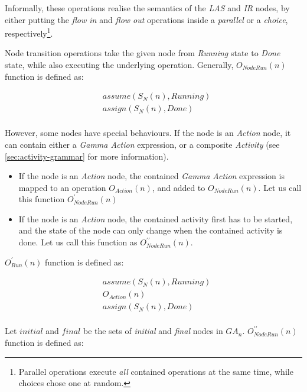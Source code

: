 Informally, these operations realise the semantics of the \emph{LAS} and \emph{IR} nodes, by either putting the \emph{flow in} and \emph{flow out} operations inside a \emph{parallel} or a \emph{choice}, respectively\footnote{Parallel operations execute \emph{all} contained operations at the same time, while choices chose one at random.}.

\begin{definition}
	Node transition operations take the given node from \emph{Running} state to \emph{Done} state, while also executing the underlying operation. Generally, \(O_\mathit{NodeRun}(n)\) function is defined as:
	
	\begin{align*}
		&\mathit{assume}(S_N(n), \mathit{Running}) \\
		&\mathit{assign}(S_N(n), \mathit{Done}) \\
	\end{align*}

	However, some nodes have special behaviours. If the node is an \emph{Action} node, it can contain either a \emph{Gamma Action} expression, or a composite \emph{Activity} (see \autoref{sec:activity-grammar} for more information).

	\begin{itemize}
		\item If the node is an \emph{Action} node, the contained \emph{Gamma Action} expression is mapped to an operation \(O_\mathit{Action}(n)\), and added to \( O_\mathit{NodeRun}(n) \). Let us call this function \(O_\mathit{NodeRun}^\prime(n)\)
		\item If the node is an \emph{Action} node, the contained activity first has to be started, and the state of the node can only change when the contained activity is done. Let us call this function as \(O_\mathit{NodeRun}^{\prime\prime}(n)\).
	\end{itemize}

	\(O_\mathit{Run}^\prime(n)\) function is defined as:
	
	\begin{align*}
		&\mathit{assume}(S_N(n), \mathit{Running}) \\
		&O_\mathit{Action}(n) \\
		&\mathit{assign}(S_N(n), \mathit{Done}) \\
	\end{align*}

	Let \(\mathit{initial}\) and \(\mathit{final}\) be the sets of \emph{initial} and \emph{final} nodes in \(\mathit{GA}_\mathit{n}\). \(O_\mathit{NodeRun}^{\prime\prime}(n)\) function is defined as:
	

\end{definition}
